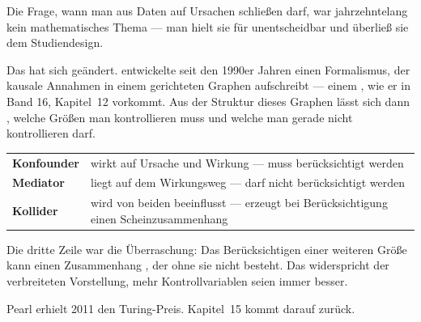 \begin{forschung}
Die Frage, wann man aus Daten auf Ursachen schließen darf, war jahrzehntelang kein mathematisches Thema --- man hielt sie für unentscheidbar und überließ sie dem Studiendesign.

Das hat sich geändert.  entwickelte seit den 1990er Jahren einen Formalismus, der kausale Annahmen in einem gerichteten Graphen aufschreibt --- einem , wie er in Band 16, Kapitel~12 vorkommt. Aus der Struktur dieses Graphen lässt sich dann , welche Größen man kontrollieren muss und welche man gerade nicht kontrollieren darf.

\begin{center}
{\small
\renewcommand{\arraystretch}{1.45}
\begin{tabular}{@{}P{2.6cm}P{5.6cm}@{}}
\toprule
\textbf{Konfounder} & wirkt auf Ursache und Wirkung --- \textcolor{gruen}{muss} berücksichtigt werden\\
\textbf{Mediator} & liegt auf dem Wirkungsweg --- \textcolor{akzent}{darf nicht} berücksichtigt werden\\
\textbf{Kollider} & wird von beiden beeinflusst --- \textcolor{akzent}{erzeugt} bei Berücksichtigung einen Scheinzusammenhang\\
\bottomrule
\end{tabular}}
\end{center}

Die dritte Zeile war die Überraschung: Das Berücksichtigen einer weiteren Größe kann einen Zusammenhang , der ohne sie nicht besteht. Das widerspricht der verbreiteten Vorstellung, mehr Kontrollvariablen seien immer besser.

Pearl erhielt 2011 den Turing-Preis. Kapitel~15 kommt darauf zurück.

\begin{center}
\begin{minipage}{0.88\textwidth}
\end{minipage}
\end{center}
\end{forschung}

